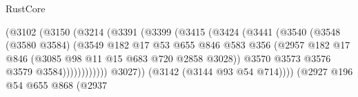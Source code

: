 \begin{lexlean}{RustCore}
\begin{coremodule}
                                      (@3102
                                        (@3150
                                          (@3214
                                            (@3391
                                              (@3399
                                                (@3415
                                                  (@3424
                                                    (@3441
                                                      (@3540
                                                        (@3548
                                                          (@3580 @3584)
                                                          (@3549
                                                            @182
                                                            @17
                                                            @53
                                                            @655
                                                            @846
                                                            @583
                                                            @356
                                                            (@2957
                                                              @182
                                                              @17
                                                              @846
                                                              (@3085
                                                                @98
                                                                @11
                                                                @15
                                                                @683
                                                                @720
                                                                @2858
                                                                @3028))
                                                            @3570
                                                            @3573
                                                            @3576
                                                            @3579
                                                            @3584))))))))))))
                                    @3027))
                                (@3142 (@3144 @93 @54 @714))))
                            (@2927
                              @196
                              @54
                              @655
                              @868
                              (@2937

\end{coremodule}
\end{lexlean}

